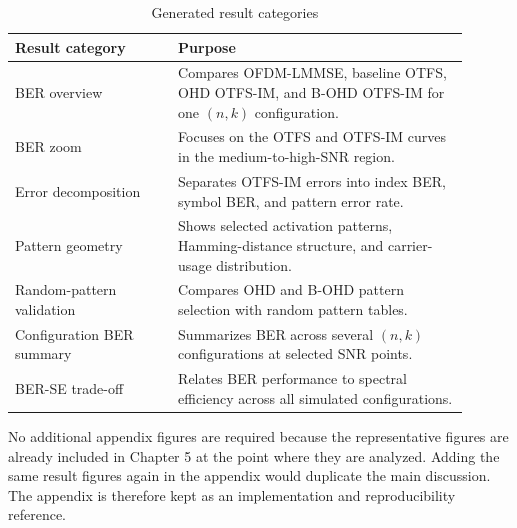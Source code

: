 \begin{table}[H]
\centering
\caption{Generated result categories}
\label{tab:appendix_generated_outputs}
\begin{tabular}{|p{0.32\linewidth}|p{0.58\linewidth}|}
\hline
\textbf{Result category} & \textbf{Purpose} \\
\hline
BER overview & Compares OFDM-LMMSE, baseline OTFS, OHD OTFS-IM, and B-OHD OTFS-IM for one \((n,k)\) configuration. \\
\hline
BER zoom & Focuses on the OTFS and OTFS-IM curves in the medium-to-high-SNR region. \\
\hline
Error decomposition & Separates OTFS-IM errors into index BER, symbol BER, and pattern error rate. \\
\hline
Pattern geometry & Shows selected activation patterns, Hamming-distance structure, and carrier-usage distribution. \\
\hline
Random-pattern validation & Compares OHD and B-OHD pattern selection with random pattern tables. \\
\hline
Configuration BER summary & Summarizes BER across several \((n,k)\) configurations at selected SNR points. \\
\hline
BER-SE trade-off & Relates BER performance to spectral efficiency across all simulated configurations. \\
\hline
\end{tabular}
\end{table}

No additional appendix figures are required because the representative figures are already included in Chapter 5 at the point where they are analyzed. Adding the same result figures again in the appendix would duplicate the main discussion. The appendix is therefore kept as an implementation and reproducibility reference.
